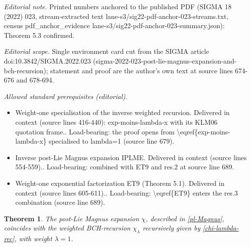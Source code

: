 \documentclass[10pt,a4paper]{article}
\numberwithin{equation}{section}
\newtheorem{Theorem}{Theorem}[section]
\begin{document}
\noindent\textit{Editorial note.} Printed numbers anchored to the published PDF (SIGMA 18 (2022) 023, stream-extracted text lane-s3/sig22-pdf-anchor-023-streams.txt, census pdf\_anchor\_evidence lane-s3/sig22-pdf-anchor-023-summary.json): Theorem 5.3 confirmed.\par\medskip
\noindent\textit{Editorial scope.} Single environment card cut from the SIGMA article doi:10.3842/SIGMA.2022.023 (sigma-2022-023-post-lie-magnus-expansion-and-bch-recursion); statement and proof are the author's own text at source lines 674-676 and 678-694.\par\medskip
\noindent\textit{Allowed standard prerequisites (editorial).}\begin{itemize}
\item Weight-one specialisation of the inverse weighted recursion. Delivered in context (source lines 416-440): exp-moins-lambda-x with its KLM06 quotation frame.. Load-bearing: the proof opens from \textbackslash{}eqref\{exp-moins-lambda-x\} specialised to lambda=1 (source line 679).
\item Inverse post-Lie Magnus expansion IPLME. Delivered in context (source lines 554-559).. Load-bearing: combined with ET9 and res.2 at source line 689.
\item Weight-one exponential factorization ET9 (Theorem 5.1). Delivered in context (source lines 605-611).. Load-bearing: \textbackslash{}eqref\{ET9\} enters the res.3 combination (source line 689).
\end{itemize}\medskip
\begin{Theorem}\label{main Theorem}
The post-Lie Magnus expansion $\chi$, described in \eqref{pl-Magnus}, coincides with the weighted BCH-recursion $\chi_{\lambda}$ recursively given by \eqref{chi-lambda-rec}, with weight $\lambda=1$.
\end{Theorem}
\end{document}
